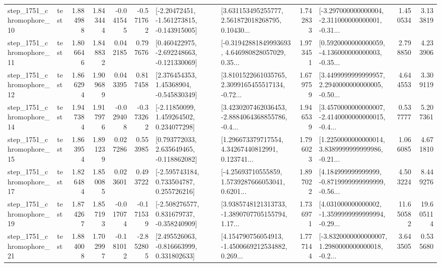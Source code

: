 \begin{tabular}{llrrrrllrlrr}
 step\_1751\_chromophore\_10 &      test &      1.884988 &    1.843444 &     -0.041545 & -0.571762 &   [-2.20472451, -1.561273815, -0.143915005] &  [3.631153495255777, 2.561872018268795, 0.10430... &       1.742833 &  [-3.297000000000004, -2.311000000000001, -0.31... &            1.450534 &          3.133819 \\
 step\_1751\_chromophore\_11 &      test &      1.806646 &    1.848832 &      0.042185 &  0.797676 &   [0.460422975, -2.692248663, -0.121330069] &  [-0.31942881849993693, 4.646980828057029, 0.35... &       1.973451 &  [0.5920000000000059, -4.136000000000003, -0.35... &            2.798850 &          4.233906 \\
 step\_1751\_chromophore\_12 &      test &      1.866294 &    1.909689 &      0.043395 &  0.817458 &     [2.376454353, 1.45368904, -0.545830349] &  [3.8101522661035765, 2.3099165455517134, -0.72... &       1.679759 &  [3.4499999999999957, 2.2940000000000005, -0.50... &            4.644553 &          3.309119 \\
 step\_1751\_chromophore\_14 &      test &      1.947384 &    1.917976 &     -0.029408 & -0.373262 &     [-2.11850099, 1.459264502, 0.234077298] &  [3.4230207462036453, -2.8884064368855786, -0.4... &       1.946539 &  [3.4570000000000007, -2.4140000000000015, -0.4... &            0.537777 &          5.207361 \\
 step\_1751\_chromophore\_15 &      test &      1.863954 &    1.891239 &      0.027286 &  0.553985 &    [0.793772033, 2.635649465, -0.118862082] &  [1.296673379717554, 4.34267440812991, 0.123741... &       1.796023 &  [1.2250000000000014, 3.8389999999999986, -0.21... &            1.066085 &          4.671810 \\
 step\_1751\_chromophore\_17 &      test &      1.826484 &    1.850085 &      0.023601 &  0.493722 &    [-2.595743184, 0.733504787, 0.255726216] &  [-4.25693710555859, 1.5739287666053041, 0.6201... &       1.897022 &  [4.184999999999999, -0.8719999999999999, -0.56... &            4.503224 &          8.449276 \\
 step\_1751\_chromophore\_19 &      test &      1.874267 &    1.857193 &     -0.017074 & -0.171539 &   [-2.508276577, 0.831679737, -0.358240909] &  [3.9385748121313733, -1.3890707705155794, 1.17... &       1.736971 &  [4.031000000000002, -1.3599999999999994, -0.29... &           11.650582 &         19.605114 \\
 step\_1751\_chromophore\_21 &      test &      1.884008 &    1.702997 &     -0.181012 & -2.852805 &    [2.495526063, -0.816663999, 0.331802633] &  [4.154790756054913, -1.4500669212534882, 0.269... &       1.777144 &  [-3.8320000000000007, 1.2980000000000018, -0.2... &            3.643505 &          0.535680 \\

\end{tabular}
